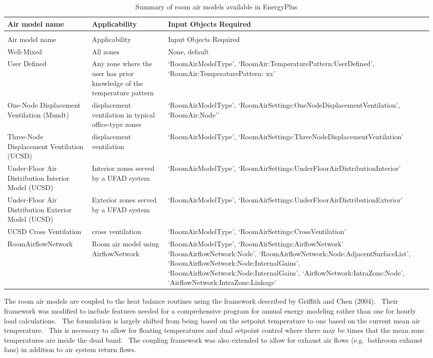 \begin{longtable}[c]{p{1.5in}p{1.5in}p{3.0in}}
\caption{Summary of room air models available in EnergyPlus \label{table:summary-of-room-air-models-available-in}} \tabularnewline
\toprule
Air model name & Applicability & Input Objects Required \tabularnewline
\midrule
\endfirsthead

\caption[]{Summary of room air models available in EnergyPlus} \tabularnewline
\toprule
Air model name & Applicability & Input Objects Required \tabularnewline
\midrule
\endhead

Well-Mixed & All zones & None, default \tabularnewline
User Defined & Any zone where the user has prior knowledge of the temperature pattern & ‘RoomAirModelType’, ‘RoomAir:TemperaturePattern:UserDefined’, ‘RoomAir:TemperaturePattern: xx’ \tabularnewline
One-Node Displacement Ventilation (Mundt) & displacement ventilation in typical office-type zones & ‘RoomAirModelType’, ‘RoomAirSettings:OneNodeDisplacementVentilation’, ‘RoomAir:Node’’ \tabularnewline
Three-Node Displacement Ventilation (UCSD) & displacement ventilation & ‘RoomAirModelType’, ‘RoomAirSettings:ThreeNodeDisplacementVentilation’ \tabularnewline
Under-Floor Air Distribution Interior Model (UCSD) & Interior zones served by a UFAD system & ‘RoomAirModelType’, ‘RoomAirSettings:UnderFloorAirDistributionInterior’ \tabularnewline
Under-Floor Air Distribution Exterior Model (UCSD) & Exterior zones served by a UFAD system & ‘RoomAirModelType’, ‘RoomAirSettings:UnderFloorAirDistributionExterior’ \tabularnewline
UCSD Cross Ventilation & cross ventilation & ‘RoomAirModelType’, ‘RoomAirSettings:CrossVentilation’ \tabularnewline
RoomAirflowNetwork & Room air model using AirflowNetwork & ‘RoomAirModelType’, ‘RoomAirSettings:AirflowNetwork’ ‘RoomAirflowNetwork:Node’, ‘RoomAirflowNetwork:Node:AdjacentSurfaceList’, ‘RoomAirflowNetwork:Node:InternalGains’, ‘RoomAirflowNetwork:Node:InternalGains’, ‘AirflowNetwork:IntraZone:Node’, ‘AirflowNetwork:IntraZone:Linkage’ \tabularnewline
\bottomrule
\end{longtable}

The room air models are coupled to the heat balance routines using the framework described by Griffith and Chen (2004).~ Their framework was modified to include features needed for a comprehensive program for annual energy modeling rather than one for hourly load calculations.~ The formulation is largely shifted from being based on the setpoint temperature to one based on the current mean air temperature.~ This is necessary to allow for floating temperatures and dual setpoint control where there may be times that the mean zone temperatures are inside the dead band.~ The coupling framework was also extended to allow for exhaust air flows (e.g.~bathroom exhaust fans) in addition to air system return flows.

